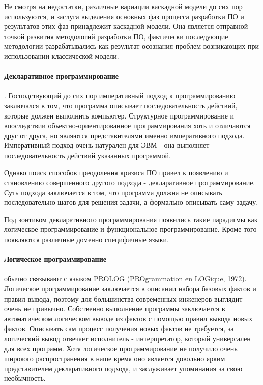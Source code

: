 Не смотря на недостатки, различные вариации каскадной модели до сих пор используются, и заслуга выделения основных фаз процесса разработки ПО и результатов этих фаз принадлежит каскадной модели. Она является отправной точкой развития методологий разработки ПО, фактически последующие методологии разрабатывались как результат осознания проблем возникающих при использовании классической модели.

\paragraph{Декларативное программирование}. Господствующий до сих пор императивный подход к программированию заключался в том, что программа описывает последовательность действий, которые должен выполнить компьютер. Структурное программирование и впоследствии объектно-ориентированное программирования хоть и отличаются друг от друга, но являются представителями именно императивного подхода. Императивный подход очень натурален для ЭВМ - она выполняет последовательность действий указанных программой.

Однако поиск способов преодоления кризиса ПО привел к появлению и становлению совершенного другого подхода - декларативное программирование. Суть подхода заключается в том, что программа должна не описывать последовательно шагов для решения задачи, а формально описывать саму задачу.

Под зонтиком декларативного программирования появились такие парадигмы как логическое программирование и функциональное программирование. Кроме того появляются различные доменно специфичные языки.

\paragraph{Логическое программирование} обычно связывают с языком PROLOG (PROgrammation en LOGique, 1972). Логическое программирование заключается в описании набора базовых фактов и правил вывода, поэтому для большинства современных инженеров выглядит очень не привычно. Собственно выполнение программы заключается в автоматическом логическом выводе из фактов с помощью правил вывода новых фактов. Описывать сам процесс получения новых фактов не требуется, за логический вывод отвечает исполнитель - интерпретатор, который универсален для всех программ. Хотя логическое программирование не получило очень широкого распространения в наше время оно является довольно ярким представителем декларативного подхода, и заслуживает упоминания за свою необычность.

